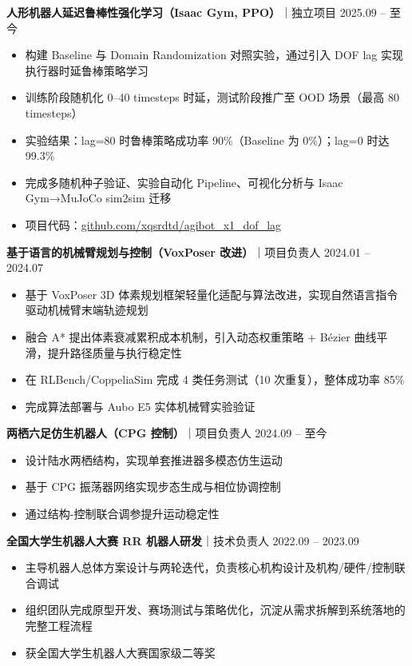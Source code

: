 \documentclass[11pt]{article}
\begin{document}
\textbf{人形机器人延迟鲁棒性强化学习（Isaac Gym, PPO）}｜独立项目 \hfill 2025.09 – 至今
\begin{itemize}
\item 构建 Baseline 与 Domain Randomization 对照实验，通过引入 DOF lag 实现执行器时延鲁棒策略学习
\item 训练阶段随机化 0–40 timesteps 时延，测试阶段推广至 OOD 场景（最高 80 timesteps）
\item 实验结果：lag=80 时鲁棒策略成功率 90\%（Baseline 为 0\%）；lag=0 时达 99.3\%
\item 完成多随机种子验证、实验自动化 Pipeline、可视化分析与 Isaac Gym→MuJoCo sim2sim 迁移
\item 项目代码：\href{https://github.com/xqsrdtd/agibot_x1_dof_lag}{github.com/xqsrdtd/agibot_x1_dof_lag}
\end{itemize}

\textbf{基于语言的机械臂规划与控制（VoxPoser 改进）}｜项目负责人 \hfill 2024.01 – 2024.07
\begin{itemize}
\item 基于 VoxPoser 3D 体素规划框架轻量化适配与算法改进，实现自然语言指令驱动机械臂末端轨迹规划
\item 融合 A* 提出体素衰减累积成本机制，引入动态权重策略 + Bézier 曲线平滑，提升路径质量与执行稳定性
\item 在 RLBench/CoppeliaSim 完成 4 类任务测试（10 次重复），整体成功率 85\%
\item 完成算法部署与 Aubo E5 实体机械臂实验验证
\end{itemize}

\textbf{两栖六足仿生机器人（CPG 控制）}｜项目负责人 \hfill 2024.09 – 至今
\begin{itemize}
\item 设计陆水两栖结构，实现单套推进器多模态仿生运动
\item 基于 CPG 振荡器网络实现步态生成与相位协调控制
\item 通过结构-控制联合调参提升运动稳定性
\end{itemize}

\textbf{全国大学生机器人大赛 RR 机器人研发}｜技术负责人 \hfill 2022.09 – 2023.09
\begin{itemize}
\item 主导机器人总体方案设计与两轮迭代，负责核心机构设计及机构/硬件/控制联合调试
\item 组织团队完成原型开发、赛场测试与策略优化，沉淀从需求拆解到系统落地的完整工程流程
\item 获全国大学生机器人大赛国家级二等奖
\end{itemize}
\end{document}
